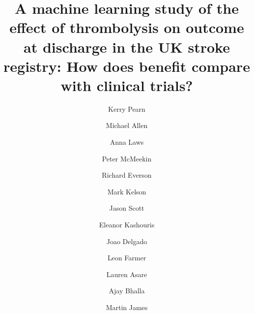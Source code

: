 

\title{A machine learning study of the effect of thrombolysis on outcome at discharge in the UK stroke registry: How does benefit compare with clinical trials?}


\renewcommand{\thefootnote}{\fnsymbol{footnote}}
\author[1,2]{Kerry Pearn}
\author[*1,2]{Michael Allen}
\author[1,2]{Anna Laws}
\author[4]{Peter McMeekin}
\author[3]{Richard Everson}
\author[3]{Mark Kelson}
\author[4]{Jason Scott}
\author[4]{Eleanor Kashouris}
\author[1]{Joao Delgado}
\author[1,2]{Leon Farmer}
\author[1,2]{Lauren Asare}
\author[5]{Ajay Bhalla}
\author[1,2]{Martin James}


\date{}